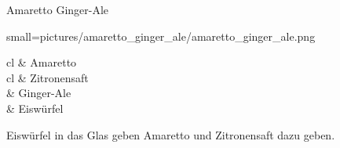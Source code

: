 \begin{recipe}
	[
	preparationtime = {\unit[5]{min}},
	bakingtime,
	bakingtemperature,
	portion = {\portion{1}},
	calory,
	source
	]
	{Amaretto Ginger-Ale}
	
	\graph
	{
		small=pictures/amaretto_ginger_ale/amaretto_ginger_ale.png
	}
	
	\ingredients
	{
		\unit[40]{cl} & Amaretto \\
		\unit[20]{cl} & Zitronensaft \\
		& Ginger-Ale \\
		& Eiswürfel
	}
	
	\preparation
	{
		\step Eiswürfel in das Glas geben
		\step Amaretto und Zitronensaft dazu geben.
	}
\end{recipe}